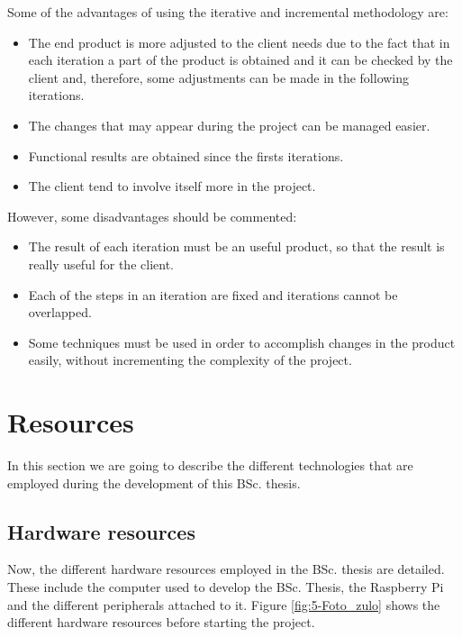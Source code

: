 Some of the advantages of using the iterative and incremental methodology are:
\begin{itemize}
	\item The end product is more adjusted to the client needs due to the fact that in each iteration a part of the product is obtained and it can be checked by the client and, therefore, some adjustments can be made in the following iterations.
	
	\item The changes that may appear during the project can be managed easier.
	
	\item Functional results are obtained since the firsts iterations.
	
	\item The client tend to involve itself more in the project. 
\end{itemize}

However, some disadvantages should be commented:
\begin{itemize}
	\item The result of each iteration must be an useful product, so that the result is really useful for the client.
	
	\item Each of the steps in an iteration are fixed and iterations cannot be overlapped.
	
	\item Some techniques must be used in order to accomplish changes in the product easily, without incrementing the complexity of the project.
\end{itemize}


\section{Resources}
In this section we are going to describe the different technologies that are employed during the development of this \ac{BSc.} thesis.

\subsection{Hardware resources}
Now, the different hardware resources employed in the \ac{BSc.} thesis are detailed. These include the computer used to develop the \ac{BSc.} Thesis, the Raspberry Pi and the different peripherals attached to it. Figure \ref{fig:5-Foto_zulo} shows the different hardware resources before starting the project.


